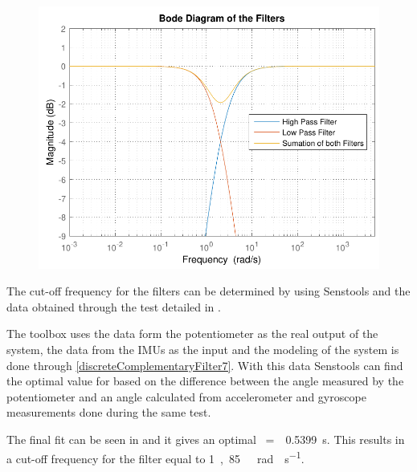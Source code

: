 \begin{minipage}{\linewidth}
\begin{minipage}{0.45\linewidth}
\begin{figure}[H]
			\includegraphics[scale=.55]{figures/bodeFilters2}
			\centering
			\captionsetup{justification=centering}
			\label{bodeFilters2}
		\end{figure}
	\end{minipage}
\end{minipage}

The cut-off frequency for the filters can be determined by using Senstools and the data obtained through the test detailed in .

The toolbox uses the data form the potentiometer as the real output of the system, the data from the IMUs as the input and the modeling of the system is done through \eqref{discreteComplementaryFilter7}. With this data Senstools can find the optimal value for \si{\tau} based on the difference between the angle measured by the potentiometer and an angle calculated from accelerometer and gyroscope measurements done during the same test.

The final fit can be seen in  and it gives an optimal \si{\tau=\ }\SI{0,5399}{s}. This results in a cut-off frequency for the filter equal to \si{1,85\ rad \cdot s^{-1}}.

